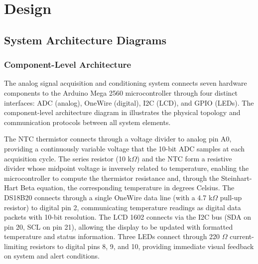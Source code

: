 \section{Design}

\subsection{System Architecture Diagrams}

\subsubsection{Component-Level Architecture}

The analog signal acquisition and conditioning system connects seven hardware components to the Arduino Mega 2560 microcontroller through four distinct interfaces: ADC (analog), OneWire (digital), I2C (LCD), and GPIO (LEDs). The component-level architecture diagram in  illustrates the physical topology and communication protocols between all system elements.

The NTC thermistor connects through a voltage divider to analog pin A0, providing a continuously variable voltage that the 10-bit ADC samples at each acquisition cycle. The series resistor (10 k$\Omega$) and the NTC form a resistive divider whose midpoint voltage is inversely related to temperature, enabling the microcontroller to compute the thermistor resistance and, through the Steinhart-Hart Beta equation, the corresponding temperature in degrees Celsius. The DS18B20 connects through a single OneWire data line (with a 4.7 k$\Omega$ pull-up resistor) to digital pin 2, communicating temperature readings as digital data packets with 10-bit resolution. The LCD 1602 connects via the I2C bus (SDA on pin 20, SCL on pin 21), allowing the display to be updated with formatted temperature and status information. Three LEDs connect through 220 $\Omega$ current-limiting resistors to digital pins 8, 9, and 10, providing immediate visual feedback on system and alert conditions.

